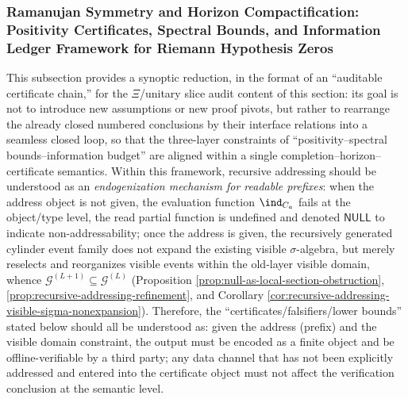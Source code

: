 \subsubsection{Ramanujan Symmetry and Horizon Compactification: Positivity Certificates, Spectral Bounds, and Information Ledger Framework for Riemann Hypothesis Zeros}\label{subsubsec:xi-ramanujan-horizon-ledger-framework}
This subsection provides a synoptic reduction, in the format of an ``auditable certificate chain,'' for the \(\Xi\)/unitary slice audit content of this section: its goal is not to introduce new assumptions or new proof pivots, but rather to rearrange the already closed numbered conclusions by their interface relations into a seamless closed loop, so that the three-layer constraints of ``positivity--spectral bounds--information budget'' are aligned within a single completion--horizon--certificate semantics.
Within this framework, recursive addressing should be understood as an \emph{endogenization mechanism for readable prefixes}: when the address object is not given, the evaluation function \(\ind_{C_a}\) fails at the object/type level, the read partial function is undefined and denoted \(\mathsf{NULL}\) to indicate non-addressability; once the address is given, the recursively generated cylinder event family does not expand the existing visible \(\sigma\)-algebra, but merely reselects and reorganizes visible events within the old-layer visible domain, whence \(\mathcal{G}^{(L+1)}\subseteq\mathcal{G}^{(L)}\) (Proposition \ref{prop:null-as-local-section-obstruction}, \ref{prop:recursive-addressing-refinement}, and Corollary \ref{cor:recursive-addressing-visible-sigma-nonexpansion}).
Therefore, the ``certificates/falsifiers/lower bounds'' stated below should all be understood as: given the address (prefix) and the visible domain constraint, the output must be encoded as a finite object and be offline-verifiable by a third party; any data channel that has not been explicitly addressed and entered into the certificate object must not affect the verification conclusion at the semantic level.

